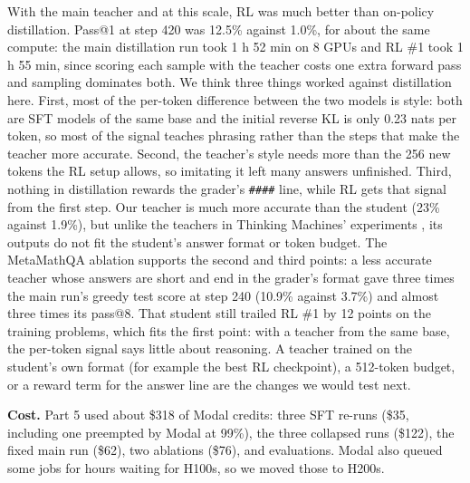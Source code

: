 \documentclass[11pt]{article}
\newcommand{\code}[1]{\texttt{#1}}
\begin{document}
With the main teacher and at this scale, RL was much better than on-policy distillation. Pass@1 at step 420 was 12.5\% against 1.0\%, for about the same compute: the main distillation run took 1 h 52 min on 8 GPUs and RL \#1 took 1 h 55 min, since scoring each sample with the teacher costs one extra forward pass and sampling dominates both. We think three things worked against distillation here. First, most of the per-token difference between the two models is style: both are SFT models of the same base and the initial reverse KL is only 0.23 nats per token, so most of the signal teaches phrasing rather than the steps that make the teacher more accurate. Second, the teacher's style needs more than the 256 new tokens the RL setup allows, so imitating it left many answers unfinished. Third, nothing in distillation rewards the grader's \code{\#\#\#\#} line, while RL gets that signal from the first step. Our teacher is much more accurate than the student (23\% against 1.9\%), but unlike the teachers in Thinking Machines' experiments \cite{opd}, its outputs do not fit the student's answer format or token budget. The MetaMathQA ablation supports the second and third points: a less accurate teacher whose answers are short and end in the grader's format gave three times the main run's greedy test score at step 240 (10.9\% against 3.7\%) and almost three times its pass@8. That student still trailed RL \#1 by 12 points on the training problems, which fits the first point: with a teacher from the same base, the per-token signal says little about reasoning. A teacher trained on the student's own format (for example the best RL checkpoint), a 512-token budget, or a reward term for the answer line are the changes we would test next.

\textbf{Cost.} Part 5 used about \$318 of Modal credits: three SFT re-runs (\$35, including one preempted by Modal at 99\%), the three collapsed runs (\$122), the fixed main run (\$62), two ablations (\$76), and evaluations. Modal also queued some jobs for hours waiting for H100s, so we moved those to H200s.
\end{document}
